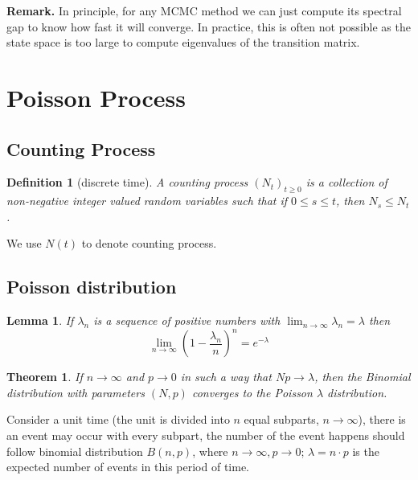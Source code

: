 \documentclass[11pt,a4paper]{article}
\newtheorem{theorem}{Theorem}
\newtheorem{definition}{Definition}
\newtheorem{lemma}{Lemma}
\begin{document}
\textbf{Remark.} In principle, for any MCMC method we can just compute its spectral gap to know how fast it will converge. In practice, this is often not possible as the state space is too large to compute eigenvalues of the transition matrix.









\section{Poisson Process}
\subsection{Counting Process}
\begin{definition}[discrete time]
    A counting process $(N_t)_{t\geq0}$ is a collection of non-negative integer valued random variables such that if $0 \leq s \leq t$, then $N_s \leq N_t$.
\end{definition}
We use $N(t)$ to denote counting process.

\subsection{Poisson distribution}
\begin{lemma}
    If $\lambda_n$ is a sequence of positive numbers with $\lim_{n \rightarrow \infty}\lambda_n=\lambda$ then $$\lim_{n \rightarrow \infty}\left(1-\frac{\lambda_n}{n}\right)^n=e^{-\lambda}$$
\end{lemma}

\begin{theorem}
    If $n \rightarrow  \infty$ and $p \rightarrow 0$ in such a way that $Np \rightarrow \lambda$, then the Binomial distribution with parameters $(N,p)$ converges to the Poisson $\lambda$ distribution.
\end{theorem}
Consider a unit time (the unit is divided into $n$ equal subparts, $n \rightarrow \infty$), there is an event may occur with every subpart, the number of the event happens should follow binomial distribution $B(n,p)$, where $n \rightarrow \infty, p \rightarrow 0$; $\lambda=n\cdot p$ is the expected number of events in this period of time.
\end{document}
